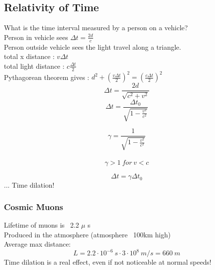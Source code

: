 \documentclass[class=article,crop=false]{standalone}
\begin{document}
\newpage
\lecture
\subsection{Relativity of Time}
\begin{question}
	What is the time interval measured by a person on a vehicle? \\
	Person in vehicle sees $\Delta t = \frac{2d}{c} $ \\
	Person outside vehicle sees the light travel along a triangle. \\
	total x distance : $v \Delta t$ \\
	total light distance : $c \frac{\Delta t}{2}$ \\
	Pythagorean theorem gives : $d^2 + (\frac{v \Delta t}{2})^2 = (\frac{c \Delta t}{2})^2 $ \\
	$$ \Delta t = \frac{2d}{\sqrt{c^2 + v^2}} $$
	$$ \Delta t = \frac{\Delta t_0}{\sqrt{1 - \frac{v^2}{c^2}}} $$
	\begin{result}
		$$ \gamma = \frac{1}{\sqrt{1 - \frac{v^2}{c^2}}} $$ \\
		$$ \gamma > 1\ for\ v < c $$
	\end{result}
$$ \Delta t = \gamma \Delta t_0 $$
	... Time dilation!
\end{question}

\subsubsection{Cosmic Muons}
Lifetime of muons is ~2.2 $\mu$ s \\
Produced in the atmosphere (atmosphere ~100km high) \\
Average max distance:
$$ L = 2.2 \cdot 10^{-6}\ s \cdot 3 \cdot 10^8\ m/s = 660\ m $$
Time dilation is a real effect, even if not noticeable at normal speeds! \\
\end{document}
